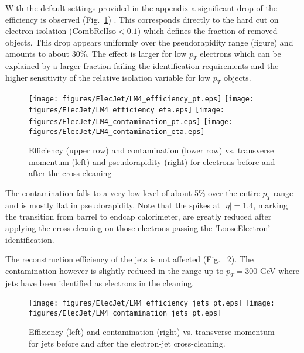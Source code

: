 \documentclass{cmspaper}
\begin{document}
With the default settings provided in the appendix a significant drop of the
efficiency is observed (Fig.~\ref{fig:effCont_elec_ElecJet}) . This
corresponds directly to the hard cut on electron isolation
($\mathrm{CombRelIso}<0.1$) which defines the fraction of removed objects. This
drop appears uniformly over the pseudorapidity range (figure) and amounts to
about 30\%.  The effect is larger for low $p_T$ electrons which can be
explained by a larger fraction failing the identification requirements and the
higher sensitivity of the relative isolation variable for low $p_T$ objects.

\begin{figure}[hb]
\begin{center}
    \texttt{[image: figures/ElecJet/LM4\_efficiency\_pt.eps]}
    \texttt{[image: figures/ElecJet/LM4\_efficiency\_eta.eps]}
    \texttt{[image: figures/ElecJet/LM4\_contamination\_pt.eps]}
    \texttt{[image: figures/ElecJet/LM4\_contamination\_eta.eps]}
    \caption{Efficiency (upper row) and contamination (lower row) vs. transverse
    momentum (left) and pseudorapidity (right) for electrons before and after
    the cross-cleaning} \label{fig:effCont_elec_ElecJet}
\end{center}
\end{figure}

The contamination falls to a very low level of about 5\% over the entire $p_T$
range and is mostly flat in pseudorapidity. Note that the spikes at
$|\eta|=1.4$, marking the transition from barrel to endcap calorimeter, are
greatly reduced after applying the cross-cleaning on those electrons passing the
'LooseElectron' identification.

The reconstruction efficiency of the jets is not affected (Fig.
~\ref{fig:effCont_Jets_ElecJet}). The contamination however is slightly reduced
in the range up to $p_T=300$ GeV where jets have been identified as electrons in
the cleaning.
\begin{figure}[hb]
\begin{center}
    \texttt{[image: figures/ElecJet/LM4\_efficiency\_jets\_pt.eps]}
    \texttt{[image: figures/ElecJet/LM4\_contamination\_jets\_pt.eps]}
    \caption{Efficiency (left) and contamination (right) vs. transverse momentum
    for jets before and after the electron-jet cross-cleaning.}
\label{fig:effCont_Jets_ElecJet}
\end{center}
\end{figure}
\end{document}

